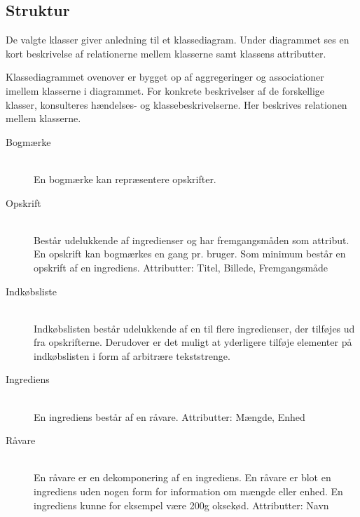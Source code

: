 \subsection{Struktur}

De valgte klasser giver anledning til et klassediagram. Under diagrammet ses en kort beskrivelse af relationerne mellem klasserne samt klassens attributter. 



Klassediagrammet ovenover er bygget op af aggregeringer og associationer imellem klasserne i diagrammet. For konkrete beskrivelser af de forskellige klasser, konsulteres hændelses- og klassebeskrivelserne. Her beskrives relationen mellem klasserne.

\begin{description}
  \item[Bogmærke] \hfill \\
    En bogmærke kan repræsentere opskrifter.

  \item[Opskrift] \hfill \\
    Består udelukkende af ingredienser og har fremgangsmåden som attribut. En opskrift kan bogmærkes en gang pr. bruger. Som minimum består en opskrift af en ingrediens.
Attributter: Titel, Billede, Fremgangsmåde

\item[Indkøbsliste] \hfill \\
  Indkøbslisten består udelukkende af en til flere ingredienser, der tilføjes ud fra opskrifterne. Derudover er det muligt at yderligere tilføje elementer på indkøbslisten i form af arbitrære tekststrenge.

\item[Ingrediens] \hfill \\
  En ingrediens består af en råvare.
Attributter: Mængde, Enhed

\item[Råvare] \hfill \\
  En råvare er en dekomponering af en ingrediens. En råvare er blot en ingrediens uden nogen form for information om mængde eller enhed. En ingrediens kunne for eksempel være 200g oksekød.
Attributter: Navn
\end{description}


